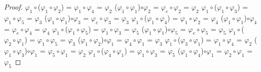 \documentclass[10pt,a4paper,oneside]{article}
\begin{document}
\begin{proof}
					\newline
					$\varphi_{1}\circ$($\varphi_{1}\circ\varphi_{2}$) = $\varphi_{1}\circ\varphi_{4}$ = $\varphi_{2}$
					\newline
					($\varphi_{1}\circ\varphi_{1}$)$\circ\varphi_{2}$ = $\varphi_{e}\circ\varphi_{2}$ = $\varphi_{2}$
					\newline
					\newline
					$\varphi_{1}\circ$($\varphi_{1}\circ\varphi_{3}$) = $\varphi_{1}\circ\varphi_{5}$ = $\varphi_{3}$
					\newline
					($\varphi_{1}\circ\varphi_{1}$)$\circ\varphi_{3}$ = $\varphi_{e}\circ\varphi_{3}$ = $\varphi_{3}$
					\newline
					\newline
					$\varphi_{1}\circ$($\varphi_{1}\circ\varphi_{4}$) = $\varphi_{1}\circ\varphi_{2}$ = $\varphi_{4}$
					\newline
					($\varphi_{1}\circ\varphi_{1}$)$\circ\varphi_{4}$ = $\varphi_{e}\circ\varphi_{4}$ = $\varphi_{4}$
					\newline
					\newline
					$\varphi_{1}\circ$($\varphi_{1}\circ\varphi_{5}$) = $\varphi_{1}\circ\varphi_{3}$ = $\varphi_{5}$
					\newline
					($\varphi_{1}\circ\varphi_{1}$)$\circ\varphi_{5}$ = $\varphi_{e}\circ\varphi_{5}$ = $\varphi_{5}$
					\newline
					\newline
					$\varphi_{1}\circ$($\varphi_{2}\circ\varphi_{1}$) = $\varphi_{1}\circ\varphi_{5}$ = $\varphi_{3}$
					\newline
					($\varphi_{1}\circ\varphi_{2}$)$\circ\varphi_{1}$ = $\varphi_{4}\circ\varphi_{1}$ = $\varphi_{3}$
					\newline
					\newline
					$\varphi_{1}\circ$($\varphi_{3}\circ\varphi_{1}$) = $\varphi_{1}\circ\varphi_{4}$ = $\varphi_{2}$
					\newline
					($\varphi_{1}\circ\varphi_{3}$)$\circ\varphi_{1}$ = $\varphi_{5}\circ\varphi_{1}$ = $\varphi_{2}$
					\newline
					\newline
					$\varphi_{1}\circ$($\varphi_{4}\circ\varphi_{1}$) = $\varphi_{1}\circ\varphi_{3}$ = $\varphi_{5}$
					\newline
					($\varphi_{1}\circ\varphi_{4}$)$\circ\varphi_{1}$ = $\varphi_{2}\circ\varphi_{1}$ = $\varphi_{5}$
					\newline

\end{proof}
\end{document}
